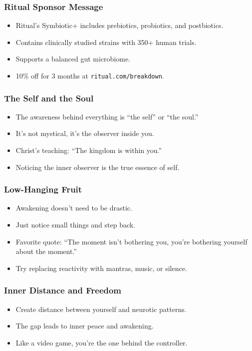 \begin{frame}[fragile]\frametitle{Ritual Sponsor Message}
  \begin{itemize}
    \item Ritual’s Symbiotic+ includes prebiotics, probiotics, and postbiotics.
    \item Contains clinically studied strains with 350+ human trials.
    \item Supports a balanced gut microbiome.
    \item 10\% off for 3 months at \texttt{ritual.com/breakdown}.
  \end{itemize}
\end{frame}

\begin{frame}[fragile]\frametitle{The Self and the Soul}
  \begin{itemize}
    \item The awareness behind everything is “the self” or “the soul.”
    \item It’s not mystical, it’s the observer inside you.
    \item Christ’s teaching: “The kingdom is within you.”
    \item Noticing the inner observer is the true essence of self.
  \end{itemize}
\end{frame}

\begin{frame}[fragile]\frametitle{Low-Hanging Fruit}
  \begin{itemize}
    \item Awakening doesn’t need to be drastic.
    \item Just notice small things and step back.
    \item Favorite quote: “The moment isn’t bothering you, you’re bothering yourself about the moment.”
    \item Try replacing reactivity with mantras, music, or silence.
  \end{itemize}
\end{frame}

\begin{frame}[fragile]\frametitle{Inner Distance and Freedom}
  \begin{itemize}
    \item Create distance between yourself and neurotic patterns.
    \item The gap leads to inner peace and awakening.
    \item Like a video game, you’re the one behind the controller.
  \end{itemize}
\end{frame}

